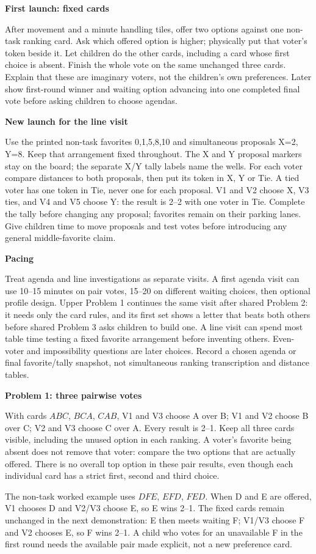 \documentclass[11pt,letterpaper]{article}
\newcommand{\heading}[1]{\par\vspace{4pt}{\large\bfseries #1}\par}
\newcommand{\sub}[1]{\par\textbf{#1}\par}
\begin{document}
\sub{First launch: fixed cards}
After movement and a minute handling tiles, offer two options against one non-task ranking card. Ask which offered option is higher; physically put that voter's token beside it. Let children do the other cards, including a card whose first choice is absent. Finish the whole vote on the same unchanged three cards. Explain that these are imaginary voters, not the children's own preferences. Later show first-round winner and waiting option advancing into one completed final vote before asking children to choose agendas.

\sub{New launch for the line visit}
Use the printed non-task favorites 0,1,5,8,10 and simultaneous proposals X=2, Y=8. Keep that arrangement fixed throughout. The X and Y proposal markers stay on the board; the separate X/Y tally labels name the wells. For each voter compare distances to both proposals, then put its token in X, Y or Tie. A tied voter has one token in Tie, never one for each proposal. V1 and V2 choose X, V3 ties, and V4 and V5 choose Y: the result is 2--2 with one voter in Tie. Complete the tally before changing any proposal; favorites remain on their parking lanes. Give children time to move proposals and test votes before introducing any general middle-favorite claim.

\sub{Pacing}
Treat agenda and line investigations as separate visits. A first agenda visit can use 10--15 minutes on pair votes, 15--20 on different waiting choices, then optional profile design. Upper Problem 1 continues the same visit after shared Problem 2: it needs only the card rules, and its first set shows a letter that beats both others before shared Problem 3 asks children to build one. A line visit can spend most table time testing a fixed favorite arrangement before inventing others. Even-voter and impossibility questions are later choices. Record a chosen agenda or final favorite/tally snapshot, not simultaneous ranking transcription and distance tables.
\newpage
\heading{Shared packet: fixed cards and agendas}
\sub{Problem 1: three pairwise votes}
With cards $ABC$, $BCA$, $CAB$, V1 and V3 choose A over B; V1 and V2 choose B over C; V2 and V3 choose C over A. Every result is 2--1. Keep all three cards visible, including the unused option in each ranking. A voter's favorite being absent does not remove that voter: compare the two options that are actually offered. There is no overall top option in these pair results, even though each individual card has a strict first, second and third choice.

The non-task worked example uses $DFE$, $EFD$, $FED$. When D and E are offered, V1 chooses D and V2/V3 choose E, so E wins 2--1. The fixed cards remain unchanged in the next demonstration: E then meets waiting F; V1/V3 choose F and V2 chooses E, so F wins 2--1. A child who votes for an unavailable F in the first round needs the available pair made explicit, not a new preference card.
\end{document}
